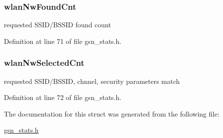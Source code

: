 \hypertarget{a00301_aa605b13b3c3c599175872366ac82733a}{
\subsubsection[{wlanNwFoundCnt}]{ {\bf wlanNwFoundCnt}}}
\label{a00301_aa605b13b3c3c599175872366ac82733a}
requested SSID/BSSID found count 

Definition at line 71 of file gsn\_\-stats.h.

\hypertarget{a00301_ad59017b297ed3bffb771d9f07f92939d}{
\subsubsection[{wlanNwSelectedCnt}]{ {\bf wlanNwSelectedCnt}}}
\label{a00301_ad59017b297ed3bffb771d9f07f92939d}
requested SSID/BSSID, chnnel, security parameters match 

Definition at line 72 of file gsn\_\-stats.h.



The documentation for this struct was generated from the following file:\begin{DoxyCompactItemize}
\item 
\hyperlink{a00591}{gsn\_\-stats.h}\end{DoxyCompactItemize}
